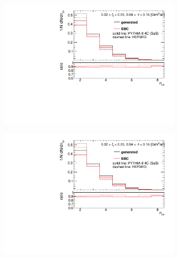 \begin{figure}[h!]
	\centering
	\begin{subfigure}{.45\textwidth}
		\includegraphics[width=\textwidth,page=1]{chapters/chrgSTAR/img/bbcCorrection/xi_bbc.pdf}
	\end{subfigure}
	\begin{subfigure}{.45\textwidth}
		\includegraphics[width=\textwidth,page=2]{chapters/chrgSTAR/img/bbcCorrection/xi_bbc.pdf}
	\end{subfigure}
	\begin{subfigure}{.45\textwidth}

\end{subfigure}
\end{figure}
